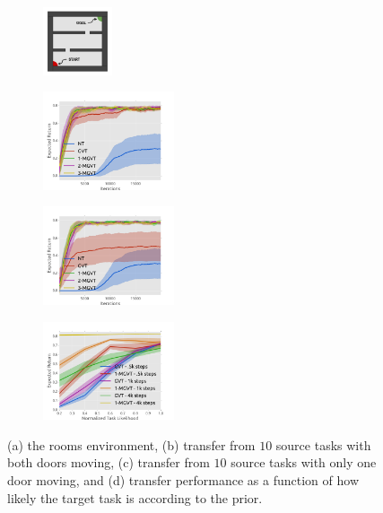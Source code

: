 \documentclass{article}
\begin{document}
\begin{figure}[t] 
  \begin{subfigure}[b]{0.15\textwidth}
    \includegraphics[trim=1.0cm 0.9cm 1.0cm 0.9cm,clip=true,height=2.0cm]{images/rooms.pdf}
    \caption{}
  \end{subfigure}
  \begin{subfigure}[b]{0.27\textwidth}
    \includegraphics[trim=0.5cm 0cm 1.8cm 1.3cm,clip=true,height=2.9cm]{images/three-room/lrev.pdf}
    \caption{}
  \end{subfigure}
    \begin{subfigure}[b]{0.27\textwidth}
    \includegraphics[trim=0.5cm 0cm 1.6cm 1.3cm,clip=true,height=2.9cm]{images/three-room-gen/lrev.pdf}
    \caption{}
  \end{subfigure}
    \begin{subfigure}[b]{0.27\textwidth}
    \includegraphics[trim=0.5cm 0cm 1.6cm 1.3cm,clip=true,height=2.9cm]{images/likelihood/lrew.pdf}
    \caption{}
  \end{subfigure}
  \caption{(a) the rooms environment, (b) transfer from $10$ source tasks with both doors moving, (c) transfer from $10$ source tasks with only one door moving, and (d) transfer performance as a function of how likely the target task is according to the prior.}
  \label{fig:dipfdbsgraphplots}
\end{figure}
\end{document}

